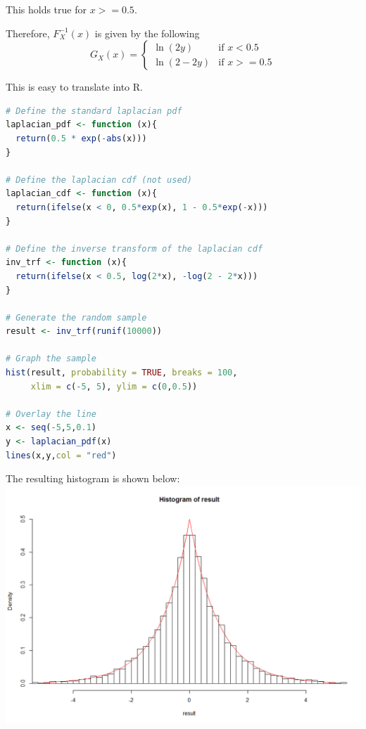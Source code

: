 \documentclass{amsart}
\theoremstyle{definition}
\theoremstyle{remark}
\begin{document}
\begin{enumerate}
This holds true for $x >= 0.5$.

Therefore, $F^{-1}_X(x)$ is given by the following
$$G_X(x) = \begin{cases}
    \ln{(2y)} & \text{if $x < 0.5$} \\
    \ln{(2 - 2y)} & \text{if $x >= 0.5$}
    \end{cases}
$$

This is easy to translate into R. 

\begin{lstlisting}[language=R]
# Define the standard laplacian pdf
laplacian_pdf <- function (x){
  return(0.5 * exp(-abs(x)))
}

# Define the laplacian cdf (not used)
laplacian_cdf <- function (x){
  return(ifelse(x < 0, 0.5*exp(x), 1 - 0.5*exp(-x)))
}

# Define the inverse transform of the laplacian cdf
inv_trf <- function (x){
  return(ifelse(x < 0.5, log(2*x), -log(2 - 2*x)))
}

# Generate the random sample
result <- inv_trf(runif(10000))

# Graph the sample
hist(result, probability = TRUE, breaks = 100,
     xlim = c(-5, 5), ylim = c(0,0.5))

# Overlay the line
x <- seq(-5,5,0.1)
y <- laplacian_pdf(x)
lines(x,y,col = "red")
\end{lstlisting}

The resulting histogram is shown below:\\
\includegraphics[scale=0.5]{laplacian}


\end{enumerate}
\end{document}
